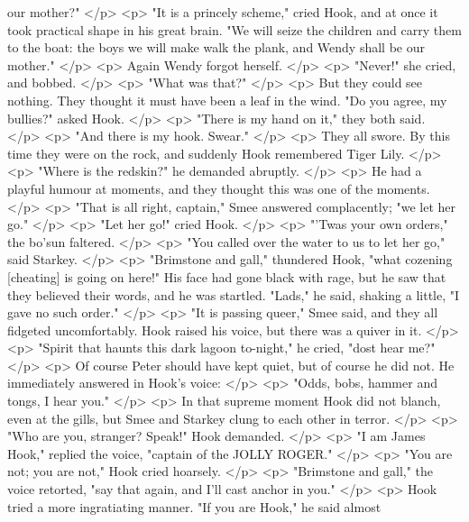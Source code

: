       our mother?"
    </p>
    <p>
      "It is a princely scheme," cried Hook, and at once it took practical shape
      in his great brain. "We will seize the children and carry them to the
      boat: the boys we will make walk the plank, and Wendy shall be our
      mother."
    </p>
    <p>
      Again Wendy forgot herself.
    </p>
    <p>
      "Never!" she cried, and bobbed.
    </p>
    <p>
      "What was that?"
    </p>
    <p>
      But they could see nothing. They thought it must have been a leaf in the
      wind. "Do you agree, my bullies?" asked Hook.
    </p>
    <p>
      "There is my hand on it," they both said.
    </p>
    <p>
      "And there is my hook. Swear."
    </p>
    <p>
      They all swore. By this time they were on the rock, and suddenly Hook
      remembered Tiger Lily.
    </p>
    <p>
      "Where is the redskin?" he demanded abruptly.
    </p>
    <p>
      He had a playful humour at moments, and they thought this was one of the
      moments.
    </p>
    <p>
      "That is all right, captain," Smee answered complacently; "we let her go."
    </p>
    <p>
      "Let her go!" cried Hook.
    </p>
    <p>
      "'Twas your own orders," the bo'sun faltered.
    </p>
    <p>
      "You called over the water to us to let her go," said Starkey.
    </p>
    <p>
      "Brimstone and gall," thundered Hook, "what cozening [cheating] is going
      on here!" His face had gone black with rage, but he saw that they believed
      their words, and he was startled. "Lads," he said, shaking a little, "I
      gave no such order."
    </p>
    <p>
      "It is passing queer," Smee said, and they all fidgeted uncomfortably.
      Hook raised his voice, but there was a quiver in it.
    </p>
    <p>
      "Spirit that haunts this dark lagoon to-night," he cried, "dost hear me?"
    </p>
    <p>
      Of course Peter should have kept quiet, but of course he did not. He
      immediately answered in Hook's voice:
    </p>
    <p>
      "Odds, bobs, hammer and tongs, I hear you."
    </p>
    <p>
      In that supreme moment Hook did not blanch, even at the gills, but Smee
      and Starkey clung to each other in terror.
    </p>
    <p>
      "Who are you, stranger? Speak!" Hook demanded.
    </p>
    <p>
      "I am James Hook," replied the voice, "captain of the JOLLY ROGER."
    </p>
    <p>
      "You are not; you are not," Hook cried hoarsely.
    </p>
    <p>
      "Brimstone and gall," the voice retorted, "say that again, and I'll cast
      anchor in you."
    </p>
    <p>
      Hook tried a more ingratiating manner. "If you are Hook," he said almost
